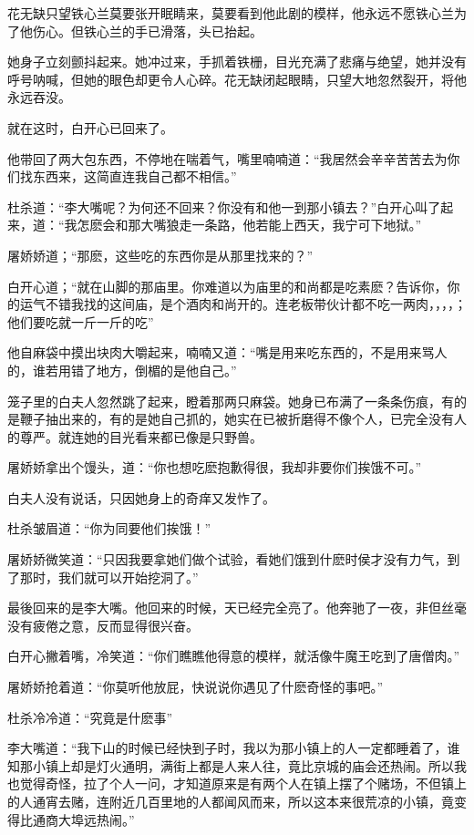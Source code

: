 \documentclass[12pt,oneside]{book}
\begin{document}
花无缺只望铁心兰莫要张开眠睛来，莫要看到他此剧的模样，他永远不愿铁心兰为了他伤心。但铁心兰的手已滑落，头已抬起。

她身子立刻颤抖起来。她冲过来，手抓着铁栅，目光充满了悲痛与绝望，她并没有呼号呐喊，但她的眼色却更令人心碎。花无缺闭起眼睛，只望大地忽然裂开，将他永远吞没。

就在这时，白开心已回来了。

他带回了两大包东西，不停地在喘着气，嘴里喃喃道：``我居然会辛辛苦苦去为你们找东西来，这简直连我自己都不相信。''

杜杀道：``李大嘴呢？为何还不回来？你没有和他一到那小镇去？''白开心叫了起来，道：``我怎麽会和那大嘴狼走一条路，他若能上西天，我宁可下地狱。''

屠娇娇道；``那麽，这些吃的东西你是从那里找来的？''

白开心道；``就在山脚的那庙里。你难道以为庙里的和尚都是吃素麽？告诉你，你的运气不错我找的这间庙，是个酒肉和尚开的。连老板带伙计都不吃一两肉，，，，；他们要吃就一斤一斤的吃''

他自麻袋中摸出块肉大嚼起来，喃喃又道：``嘴是用来吃东西的，不是用来骂人的，谁若用错了地方，倒楣的是他自己。''

笼子里的白夫人忽然跳了起来，瞪着那两只麻袋。她身已布满了一条条伤痕，有的是鞭子抽出来的，有的是她自己抓的，她实在已被折磨得不像个人，已完全没有人的尊严。就连她的目光看来都已像是只野兽。

屠娇娇拿出个馒头，道：``你也想吃麽抱歉得很，我却非要你们挨饿不可。''

白夫人没有说话，只因她身上的奇痒又发怍了。

杜杀皱眉道：``你为同要他们挨饿！''

屠娇娇微笑道：``只因我要拿她们做个试验，看她们饿到什麽时侯才没有力气，到了那时，我们就可以开始挖洞了。''

最後回来的是李大嘴。他回来的时候，天已经完全亮了。他奔驰了一夜，非但丝毫没有疲倦之意，反而显得很兴奋。

白开心撇着嘴，冷笑道：``你们瞧瞧他得意的模样，就活像牛魔王吃到了唐僧肉。''

屠娇娇抢着道：``你莫听他放屁，快说说你遇见了什麽奇怪的事吧。''

杜杀冷冷道：``究竟是什麽事''

李大嘴道：``我下山的时候已经快到子时，我以为那小镇上的人一定都睡着了，谁知那小镇上却是灯火通明，满街上都是人来人往，竟比京城的庙会还热闹。所以我也觉得奇怪，拉了个人一问，才知道原来是有两个人在镇上摆了个赌场，不但镇上的人通宵去赌，连附近几百里地的人都闻风而来，所以这本来很荒凉的小镇，竟变得比通商大埠远热闹。''
\end{document}
